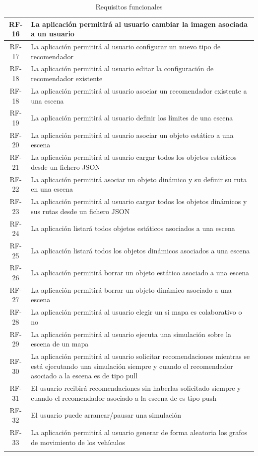 \begin{longtable}[H]{|c|p{10cm}|}
	RF-16 & La aplicación permitirá al usuario cambiar la imagen asociada a un usuario\\ \hline
	RF-17 & La aplicación permitirá al usuario configurar un nuevo tipo de recomendador\\ \hline
	RF-18 & La aplicación permitirá al usuario editar la configuración de recomendador existente\\ \hline
	RF-18 & La aplicación permitirá al usuario asociar un recomendador existente a una escena\\ \hline
	RF-19 & La aplicación permitirá al usuario definir los límites de una escena\\ \hline
	RF-20 & La aplicación permitirá al usuario asociar un objeto estático a una escena\\ \hline
	RF-21 & La aplicación permitirá al usuario cargar todos los objetos estáticos desde un fichero JSON\\ \hline
	RF-22 & La aplicación permitirá asociar un objeto dinámico y su definir su ruta en una escena\\ \hline
	RF-23 & La aplicación permitirá al usuario cargar todos los objetos dinámicos y sus rutas desde un fichero JSON\\ \hline
	RF-24 & La aplicación listará todos objetos estáticos asociados a una escena \\ \hline
	RF-25 & La aplicación listará todos los objetos dinámicos asociados a una escena \\ \hline
	RF-26 & La aplicación permitirá borrar un objeto estático asociado a una escena\\ \hline
	RF-27 & La aplicación permitirá borrar un objeto dinámico asociado a una escena\\ \hline
	RF-28 & La aplicación permitirá al usuario elegir un si mapa es colaborativo o no\\ \hline
	RF-29 & La aplicación permitirá al usuario ejecuta una simulación sobre la escena de un mapa\\ \hline
	RF-30 & La aplicación permitirá al usuario solicitar recomendaciones mientras se está ejecutando una simulación siempre y cuando el recomendador asociado a la escena es de tipo pull\\ \hline
	RF-31 & El usuario recibirá recomendaciones sin haberlas solicitado siempre y cuando el recomendador asociado a la escena de es tipo push\\ \hline
	RF-32 & El usuario puede arrancar/pausar una simulación\\ \hline
	RF-33 & La aplicación permitirá al usuario generar de forma aleatoria los grafos de movimiento de los vehículos \\ \hline	
	\caption{Requisitos funcionales}
	\label{tabla:requisitosFuncionales2}
\end{longtable}


